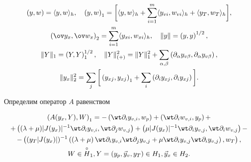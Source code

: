 \begin{gather*}


\Scal{y,w}=\Dual{y,w},\quad \Scal{y,w}_1= \bigg[ \Dual{y,w}+


\sum_{i=1}^m \Dual{y_{vi},w_{vi}}+\Dual{y_T,w_T} \bigg],\\


\Scal{\ov y_x,\ov w_x}_2=\sum_{i=1}^m \Dual{y_{xi},w_{xi}},\quad


\|y\|=\Scal{y,y}^{1/2},\\


\|Y\|_1=\Scal{Y,Y}_1^{1/2},\quad  \|Y\|_{(+)}^2=\|Y\|_1^2+


\sum_{\alpha ,\beta}\Scal{\partial_\alpha  y_{v\beta }, \partial_\alpha  


y_{v\beta }},\\


\|y_x\|_2^2=\sum_j \bigg[


\Scal{y_{xj},y_{xj}}_1+\sum_i \Scal{\partial_i y_{xj},   \partial_i y_{xj}}


\bigg].


\end{gather*}


Определим оператор $A$ равенством


\begin{gather}


\Scal{A(y_x,Y),W}_1=


-\Scal{\wt \partial_{i}y_{v,i},w_p}+


\Scal{\wt \partial_{i}w_{v,i},y_p}+\notag\\


\label{opA}


+\Scal{(\lambda+\mu)|J(y_x)|^{-1} \wt \partial_{i}y_{v,i},


\wt \partial_{j}w_{v,j}}


+\Scal{\mu|J(y_x)|^{-1} \wt \partial_{i}y_{v,j},


\wt \partial_{i}w_{v,j}}-\\


-\Scal{(y_T|J(y_x)|)^{-1}\left(\left(\lambda+\mu \right)


\wt \partial_{i}y_{v,i}\wt \partial_{j}y_{v,j}


+\mu \wt \partial_{i}y_{v,j}\wt \partial_{i}y_{v,j}\right),w_T},\notag\\


W\in \ZeroUp{H}_1, Y=(y_p,\Vec y_v,y_T)\in H_1, \Vec y_x \in H_2.\notag


\end{gather}


